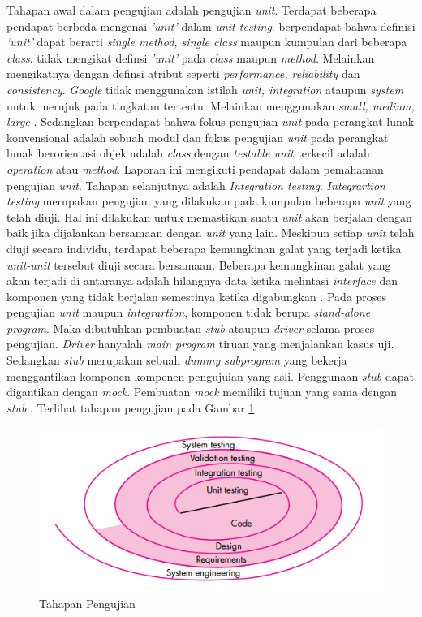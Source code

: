 Tahapan awal dalam pengujian adalah pengujian \emph{unit}. Terdapat
beberapa pendapat berbeda mengenai \emph{'unit'} dalam \emph{unit
testing}. \textcite{martin2014unittest} berpendapat bahwa definisi
\emph{`unit'} dapat berarti \emph{single method, single class} maupun
kumpulan dari beberapa \emph{class}. \textcite{osherove2015art} tidak
mengikat definsi \emph{'unit'} pada \emph{class} maupun
\emph{method}. Melainkan mengikatnya dengan definsi atribut seperti
\emph{performance, reliability} dan \emph{consistency}. \emph{Google}
tidak menggunakan istilah \emph{unit, integration} ataupun
\emph{system} untuk merujuk pada tingkatan tertentu. Melainkan
menggunakan \emph{small, medium, large}
\parencite{whittaker2012google}. Sedangkan
\textcite{presman2010software} berpendapat bahwa fokus pengujian
\emph{unit} pada perangkat lunak konvensional adalah sebuah modul dan
fokus pengujian \emph{unit} pada perangkat lunak berorientasi objek
adalah \emph{class} dengan \emph{testable unit} terkecil adalah
\emph{operation} atau \emph{method}. Laporan ini mengikuti pendapat
\textcite{presman2010software} dalam pemahaman pengujian
\emph{unit}. Tahapan selanjutnya adalah \emph{Integration
testing}. \emph{Integrartion testing} merupakan pengujian yang
dilakukan pada kumpulan beberapa \emph{unit} yang telah diuji. Hal ini
dilakukan untuk memastikan suatu \emph{unit} akan berjalan dengan baik
jika dijalankan bersamaan dengan \emph{unit} yang lain. Meskipun
setiap \emph{unit} telah diuji secara individu, terdapat beberapa
kemungkinan galat yang terjadi ketika \emph{unit-unit} tersebut diuji
secara bersamaan. Beberapa kemungkinan galat yang akan terjadi
di antaranya adalah hilangnya data ketika melintasi \emph{interface}
dan komponen yang tidak berjalan semestinya ketika digabungkan
\parencite{presman2010software}. Pada proses pengujian \emph{unit} maupun
\emph{integrartion}, komponen tidak berupa \emph{stand-alone program}.
Maka dibutuhkan pembuatan \emph{stub} ataupun \emph{driver} selama proses pengujian.
\emph{Driver} hanyalah \emph{main program} tiruan yang menjalankan kasus uji.
Sedangkan \emph{stub} merupakan sebuah \emph{dummy subprogram} yang
bekerja menggantikan komponen-kompenen pengujuian yang
asli. Penggunaan \emph{stub} dapat digantikan dengan
\emph{mock}. Pembuatan \emph{mock} memiliki tujuan yang sama dengan
\emph{stub} \parencite{martin2007stub} .
Terlihat tahapan pengujian pada Gambar \ref{fig:testing-level}.

\begin{figure}[H]
  \centering
  \includegraphics[width=.7\linewidth]{img/tahapan-pengujian}
  \caption{Tahapan Pengujian \parencite{presman2010software}}
  \label{fig:testing-level}
\end{figure}


